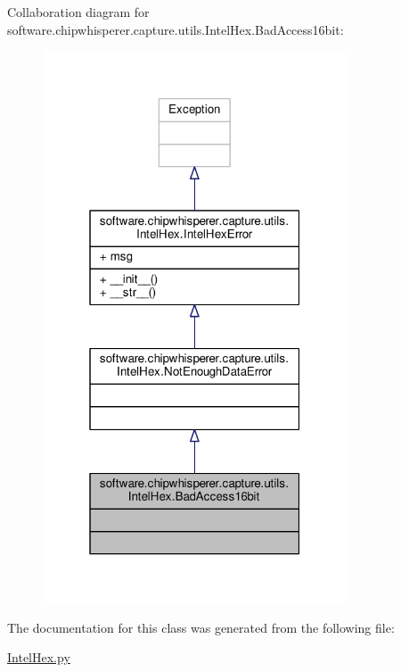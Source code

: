 Collaboration diagram for software.\+chipwhisperer.\+capture.\+utils.\+Intel\+Hex.\+Bad\+Access16bit\+:\nopagebreak
\begin{figure}[H]
\begin{center}
\leavevmode
\includegraphics[width=256pt]{d7/dc4/classsoftware_1_1chipwhisperer_1_1capture_1_1utils_1_1IntelHex_1_1BadAccess16bit__coll__graph}
\end{center}
\end{figure}


The documentation for this class was generated from the following file\+:\begin{DoxyCompactItemize}
\item 
\hyperlink{IntelHex_8py}{Intel\+Hex.\+py}\end{DoxyCompactItemize}
